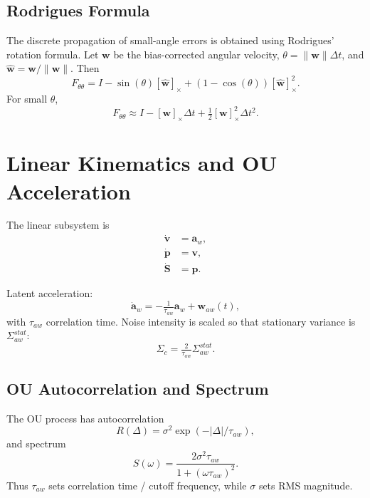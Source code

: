 \documentclass[11pt]{article}
\begin{document}
\subsection{Rodrigues Formula}
The discrete propagation of small-angle errors is obtained using Rodrigues’ rotation formula.  
Let $\bm w$ be the bias-corrected angular velocity, $\theta=\|\bm w\|\Delta t$, and $\hat{\bm w}=\bm w/\|\bm w\|$. Then
\begin{equation}
F_{\theta\theta} = 
I - \sin(\theta)[\hat{\bm w}]_\times + (1-\cos(\theta))[\hat{\bm w}]_\times^2.
\label{eq:rodrigues}
\end{equation}
For small $\theta$,
\begin{equation}
F_{\theta\theta} \approx I - [\bm w]_\times \Delta t + \tfrac{1}{2}[\bm w]_\times^2 \Delta t^2.
\end{equation}

\section{Linear Kinematics and OU Acceleration}
The linear subsystem is
\begin{align}
\dot{\bm v} &= \bm a_w, \\
\dot{\bm p} &= \bm v, \\
\dot{\bm S} &= \bm p.
\end{align}

Latent acceleration:
\begin{equation}
\dot{\bm a}_w = -\tfrac{1}{\tau_{aw}}\bm a_w + \bm w_{aw}(t),
\end{equation}
with $\tau_{aw}$ correlation time.  
Noise intensity is scaled so that stationary variance is $\Sigma_{aw}^{stat}$:
\begin{equation}
\Sigma_c = \tfrac{2}{\tau_{aw}} \Sigma_{aw}^{stat}.
\end{equation}

\subsection{OU Autocorrelation and Spectrum}
The OU process has autocorrelation
\begin{equation}
R(\Delta) = \sigma^2 \exp(-|\Delta|/\tau_{aw}),
\end{equation}
and spectrum
\begin{equation}
S(\omega) = \frac{2\sigma^2\tau_{aw}}{1+(\omega\tau_{aw})^2}.
\end{equation}
Thus $\tau_{aw}$ sets correlation time / cutoff frequency, while $\sigma$ sets RMS magnitude.
\end{document}
